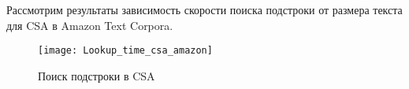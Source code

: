 \newpage
Рассмотрим результаты зависимость скорости поиска подстроки от размера текста для CSA в Amazon Text Corpora.\\

\begin{figure}[h!]
	\texttt{[image: Lookup\_time\_csa\_amazon]}
	\caption{Поиск подстроки в CSA}
	\centering
	\label{fig:CSA_Lookup_time_csa_amazon}
\end{figure}
